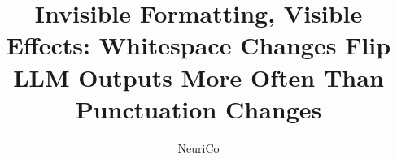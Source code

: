 \documentclass{article}
\title{Invisible Formatting, Visible Effects: Whitespace Changes Flip LLM Outputs More Often Than Punctuation Changes}
\author{NeuriCo}
\begin{document}
\maketitle

\begin{abstract}

\end{abstract}










\appendix

\end{document}
